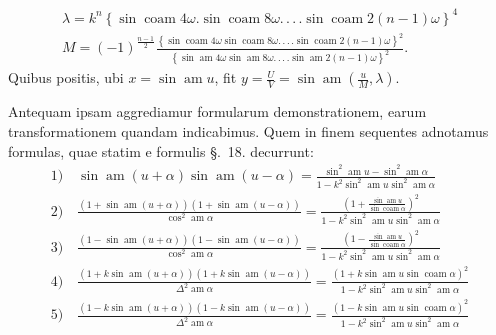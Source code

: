 \documentclass{article}
\begin{document}
\[
\begin{gathered}
\lambda=k^{n}\left\{\sin\operatorname{coam}4\omega.\sin\operatorname{coam}8\omega.\,.\,.\,.\sin\operatorname{coam}2(n-1)\omega\right\}^{4}\\[1.5ex]
M=(-1)^{\frac{n-1}{2}}\frac{\left\{\sin\operatorname{coam}4\omega\sin\operatorname{coam}8\omega.\,.\,.\,.\sin\operatorname{coam}2(n-1)\omega\right\}^{2}}{\left\{\sin\operatorname{am}4\omega\sin\operatorname{am}8\omega.\,.\,.\,.\sin\operatorname{am}2(n-1)\omega\right\}^{2}}.
\end{gathered}
\]
Quibus positis, ubi $x=\sin\operatorname{am}u$, fit $y=\frac{U}{V}=\sin\operatorname{am}\left(\frac{u}{M},\lambda\right)$.

Antequam ipsam aggrediamur formularum demonstrationem, earum transformationem quandam indicabimus. Quem in finem sequentes adnotamus formulas, quae statim e formulis §.\ 18. decurrunt:
\[
\begin{gathered}
\text{1)}\quad\sin\operatorname{am}(u+\alpha)\sin\operatorname{am}(u-\alpha)=\frac{\sin^{2}\operatorname{am}u-\sin^{2}\operatorname{am}\alpha}{1-k^{2}\sin^{2}\operatorname{am}u\sin^{2}\operatorname{am}\alpha}\\[1.5ex]
\text{2)}\quad\frac{\left(1+\sin\operatorname{am}(u+\alpha)\right)\left(1+\sin\operatorname{am}(u-\alpha)\right)}{\cos^{2}\operatorname{am}\alpha}=\frac{\left(1+\frac{\sin\operatorname{am}u}{\sin\operatorname{coam}\alpha}\right)^{2}}{1-k^{2}\sin^{2}\operatorname{am}u\sin^{2}\operatorname{am}\alpha}\\[1.5ex]
\text{3)}\quad\frac{\left(1-\sin\operatorname{am}(u+\alpha)\right)\left(1-\sin\operatorname{am}(u-\alpha)\right)}{\cos^{2}\operatorname{am}\alpha}=\frac{\left(1-\frac{\sin\operatorname{am}u}{\sin\operatorname{coam}\alpha}\right)^{2}}{1-k^{2}\sin^{2}\operatorname{am}u\sin^{2}\operatorname{am}\alpha}\\[1.5ex]
\text{4)}\quad\frac{\left(1+k\sin\operatorname{am}(u+\alpha)\right)\left(1+k\sin\operatorname{am}(u-\alpha)\right)}{\Delta^{2}\operatorname{am}\alpha}=\frac{\left(1+k\sin\operatorname{am}u\sin\operatorname{coam}\alpha\right)^{2}}{1-k^{2}\sin^{2}\operatorname{am}u\sin^{2}\operatorname{am}\alpha}\\[1.5ex]
\text{5)}\quad\frac{\left(1-k\sin\operatorname{am}(u+\alpha)\right)\left(1-k\sin\operatorname{am}(u-\alpha)\right)}{\Delta^{2}\operatorname{am}\alpha}=\frac{\left(1-k\sin\operatorname{am}u\sin\operatorname{coam}\alpha\right)^{2}}{1-k^{2}\sin^{2}\operatorname{am}u\sin^{2}\operatorname{am}\alpha}
\end{gathered}
\]
\end{document}
